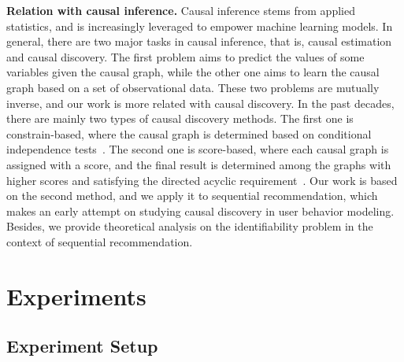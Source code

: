 \documentclass[conference]{IEEEtran}
\theoremstyle{definition}
\theoremstyle{theorem}
\theoremstyle{proof}
\theoremstyle{remark}
\begin{document}
\textbf{Relation with causal inference.}
Causal inference stems from applied statistics, and is increasingly leveraged to empower machine learning models.
In general, there are two major tasks in causal inference, that is, causal estimation and causal discovery.
The first problem aims to predict the values of some variables given the causal graph, while the other one aims to learn the causal graph based on a set of observational data.
These two problems are mutually inverse, and our work is more related with causal discovery.
In the past decades, there are mainly two types of causal discovery methods.
The first one is constrain-based, where the causal graph is determined based on conditional independence tests~\cite{spirtes2000causation,meek2013causal,zhang2008completeness}. The second one is score-based, where each causal graph is assigned with a score, and the final result is determined among the graphs with higher scores and satisfying the directed acyclic requirement~\cite{chickering2002optimal,chickering1997efficient,heckerman1995learning,bouckaert1993probabilistic}.
Our work is based on the second method, and we apply it to sequential recommendation, which makes an early attempt on studying causal discovery in user behavior modeling.
Besides, we provide theoretical analysis on the identifiability problem in the context of sequential recommendation.



\section{Experiments}\label{exper}

\subsection{Experiment Setup}
\end{document}
